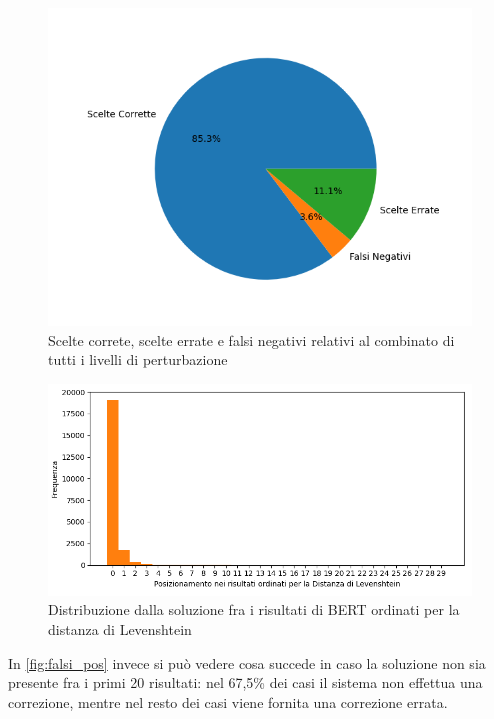 \documentclass[12pt]{article}
\begin{document}
\begin{figure}[H]
\centering
\includegraphics[width=\textwidth,trim={0 1.5cm 0 1.5cm},clip]{distributions/correct_combinato}
\caption{Scelte correte, scelte errate e falsi negativi relativi al combinato di tutti i livelli di perturbazione}
\label{fig:torta_giuste}
\end{figure}

\begin{figure}[H]
\centering
\includegraphics[width=\textwidth]{distributions/lev_pos_combinato}
\caption{Distribuzione dalla soluzione fra i risultati di BERT ordinati per la distanza di Levenshtein}
\label{fig:lev_distribution}
\end{figure}


In \autoref{fig:falsi_pos} invece si può vedere cosa succede in caso la soluzione non sia presente fra i primi 20 risultati: nel 67,5\% dei casi il sistema non effettua una correzione, mentre nel resto dei casi viene fornita una correzione errata.
\end{document}
